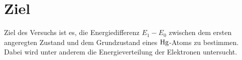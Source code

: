 \section{Ziel}
\label{sec:Ziel}

Ziel des Versuchs ist es, die Energiedifferenz $E_1 - E_0$ zwischen dem ersten angeregten Zustand und dem 
Grundzustand eines $\ce{Hg}$-Atoms zu bestimmen. 
Dabei wird unter anderem die Energieverteilung der Elektronen untersucht.
